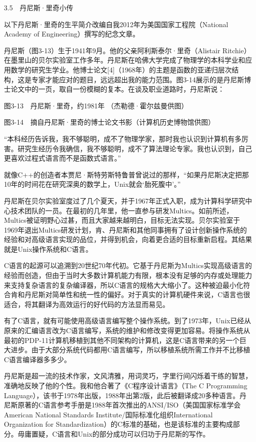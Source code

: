 \documentclass[a4paper,12pt,UTF8,twoside]{ctexbook}
\begin{document}
{3.5　丹尼斯·里奇小传


以下丹尼斯·里奇的生平简介改编自我2012年为美国国家工程院（National Academy of Engineering）撰写的纪念文章。

丹尼斯（图3-13）生于1941年9月。他的父亲阿利斯泰尔·里奇（Alistair Ritchie）在墨里山的贝尔实验室工作多年。丹尼斯在哈佛大学完成了物理学的本科学业和应用数学的研究生学业。他博士论文[4]（1968年）的主题是函数的亚递归层次结构，这是专家才能应对的题目，远远超出我的能力范围。图3-14展示的是丹尼斯博士论文中的一页，取自一份模糊的复本。在谈及职业道路时，丹尼斯说：



图3-13　丹尼斯·里奇，约1981年 （杰勒德·霍尔兹曼供图）



图3-14　摘自丹尼斯·里奇的博士论文书影（计算机历史博物馆供图）

“本科经历告诉我，我不够聪明，成不了物理学家，那时我也认识到计算机有多厉害。研究生经历令我确信，我不够聪明，成不了算法理论专家。我也认识到，自己更喜欢过程式语言而不是函数式语言。”



就像C++的创造者本贾尼·斯特劳斯特鲁普曾说过的那样，“如果丹尼斯决定把那10年的时间花在研究深奥的数学上，Unix就会‘胎死腹中’。”

丹尼斯在贝尔实验室度过了几个夏天，并于1967年正式入职，成为计算科学研究中心技术团队的一员。在最初的几年里，他一直参与研发Multics。如前所述，Multics被证明野心过甚，而且大家越来越明白，目标无法实现。贝尔实验室于1969年退出Multics研发计划，肯、丹尼斯和其他同事拥有了设计创新操作系统的经验和对高级语言实现的品位，并得到机会，向着更合适的目标重新启程。其结果就是Unix操作系统和C语言。

C语言的起源可以追溯到20世纪70年代初。它基于丹尼斯为Multics实现高级语言的经验而创造，但由于当时大多数计算机能力有限，根本没有足够的内存或处理能力来支持复杂语言的复杂编译器，所以C语言的规格大大缩小了。这种被迫最小化符合肯和丹尼斯对简单性和统一性的偏好。对于真实的计算机硬件来说，C语言也很适合，将其翻译为高效运行的好代码的方法显而易见。

有了C语言，就有可能使用高级语言编写整个操作系统。到了1973年，Unix已经从原来的汇编语言改为C语言编写，系统的维护和修改变得更加容易。将操作系统从最初的PDP-11计算机移植到其他不同架构的计算机，这是C语言带来的另一个巨大进步。由于大部分系统代码都用C语言编写，所以移植系统所需工作并不比移植C语言编译器多多少。

丹尼斯是超一流的技术作家，文风清雅，用词灵巧，字里行间闪烁着干练的智慧，准确地反映了他的个性。我和他合著了《C程序设计语言》（The C Programming Language），该书于1978年出版，1988年出第2版，此后被翻译成20多种语言。丹尼斯原著的C语言参考手册是1988年首次推出的ANSI/ISO（美国国家标准学会American National Standards Institute/国际标准化组织International Organization for Standardization）的C标准的基础，也是该标准的主要构成部分。毋庸置疑，C语言和Unix的部分成功可以归功于丹尼斯的写作。

}
\end{document}
